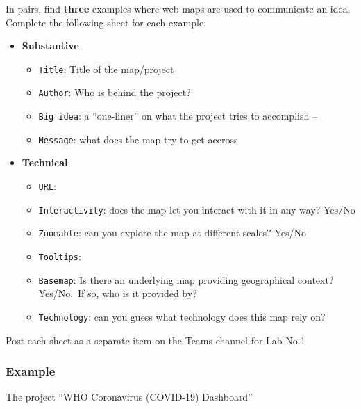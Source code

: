 \documentclass[
  letterpaper,
  DIV=11,
  numbers=noendperiod]{scrreprt}
\providecommand{\tightlist}{%
  \setlength{\itemsep}{0pt}\setlength{\parskip}{0pt}}\usepackage{longtable,booktabs,array}
\begin{document}
In pairs, find \textbf{three} examples where web maps are used to
communicate an idea. Complete the following sheet for each example:

\begin{itemize}
\tightlist
\item
  \textbf{Substantive}

  \begin{itemize}
  \tightlist
  \item
    \texttt{Title}: Title of the map/project
  \item
    \texttt{Author}: Who is behind the project?
  \item
    \texttt{Big\ idea}: a ``one-liner'' on what the project tries to
    accomplish --
  \item
    \texttt{Message}: what does the map try to get accross
  \end{itemize}
\item
  \textbf{Technical}

  \begin{itemize}
  \tightlist
  \item
    \texttt{URL}:
  \item
    \texttt{Interactivity}: does the map let you interact with it in any
    way? Yes/No
  \item
    \texttt{Zoomable}: can you explore the map at different scales?
    Yes/No
  \item
    \texttt{Tooltips}:
  \item
    \texttt{Basemap}: Is there an underlying map providing geographical
    context? Yes/No.~If so, who is it provided by?
  \item
    \texttt{Technology}: can you guess what technology does this map
    rely on?
  \end{itemize}
\end{itemize}

Post each sheet as a separate item on the Teams channel for Lab No.1

\subsubsection{Example}\label{example}

The project ``WHO Coronavirus (COVID-19) Dashboard''
\end{document}
